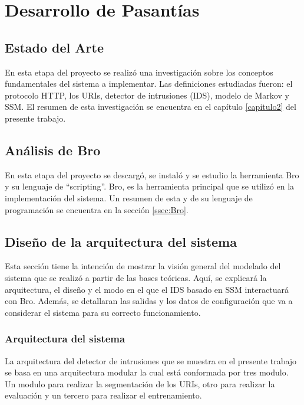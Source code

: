 \chapter{Desarrollo de Pasantías}
\label{capitulo3}

\section{Estado del Arte}

En esta etapa del proyecto se realizó una investigación sobre los conceptos fundamentales del sistema a implementar. Las definiciones estudiadas fueron: el protocolo HTTP, los URIs, detector de intrusiones (IDS), modelo de Markov y SSM.
El resumen de esta investigación se encuentra en el capítulo \ref{capitulo2} del presente trabajo.

\section{Análisis de Bro}

En esta etapa del proyecto se descargó, se instaló y se estudio la herramienta Bro y su lenguaje de ``scripting''. Bro, es la herramienta principal que se utilizó en la implementación del sistema. Un resumen de esta y de su lenguaje de programación se encuentra en la sección \ref{ssec:Bro}.

\section{Diseño de la arquitectura del sistema}

Esta sección tiene la intención de mostrar la visión general del modelado del sistema que se realizó a partir de las bases teóricas. Aquí, se explicará la arquitectura, el diseño y el modo en el que el IDS basado en SSM interactuará con Bro. Además, se detallaran las salidas y los datos de configuración
que va a considerar el sistema para su correcto funcionamiento.

\subsection{Arquitectura del sistema}

La arquitectura del detector de intrusiones que se muestra en el presente trabajo se basa en una arquitectura modular la cual está conformada por tres modulo. Un modulo para realizar la segmentación de los URIs, otro  para realizar la evaluación y un tercero para realizar el entrenamiento.


